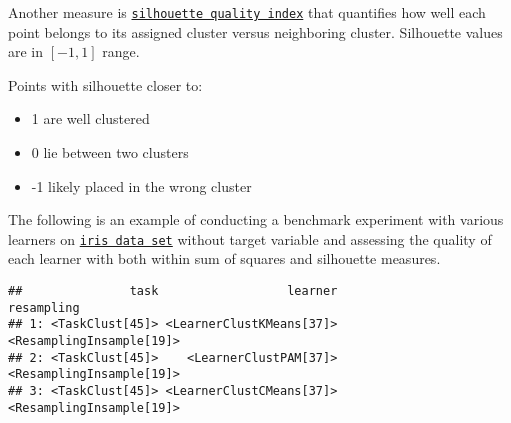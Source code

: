 \documentclass[
]{scrbook}
\newenvironment{Shaded}{\begin{snugshade}}{\end{snugshade}}
\newcommand{\AttributeTok}[1]{\textcolor[rgb]{0.77,0.63,0.00}{#1}}
\newcommand{\DecValTok}[1]{\textcolor[rgb]{0.00,0.00,0.81}{#1}}
\newcommand{\FunctionTok}[1]{\textcolor[rgb]{0.00,0.00,0.00}{#1}}
\newcommand{\NormalTok}[1]{#1}
\newcommand{\OtherTok}[1]{\textcolor[rgb]{0.56,0.35,0.01}{#1}}
\newcommand{\SpecialCharTok}[1]{\textcolor[rgb]{0.00,0.00,0.00}{#1}}
\newcommand{\StringTok}[1]{\textcolor[rgb]{0.31,0.60,0.02}{#1}}
\providecommand{\tightlist}{%
  \setlength{\itemsep}{0pt}\setlength{\parskip}{0pt}}
\renewenvironment{Shaded} {\begin{snugshade}\small} {\end{snugshade}}
\begin{document}
Another measure is \href{https://mlr3cluster.mlr-org.com/reference/mlr_measures_clust.silhouette.html}{\texttt{silhouette\ quality\ index}} that quantifies how well each point belongs to its assigned cluster versus neighboring cluster.
Silhouette values are in \([-1, 1]\) range.

Points with silhouette closer to:

\begin{itemize}
\tightlist
\item
  1 are well clustered
\item
  0 lie between two clusters
\item
  -1 likely placed in the wrong cluster
\end{itemize}

The following is an example of conducting a benchmark experiment with various learners on \href{https://mlr3.mlr-org.com/reference/mlr_tasks_iris.html}{\texttt{iris\ data\ set}} without target variable and assessing the quality of each learner with both within sum of squares and silhouette measures.

\begin{Shaded}
\end{Shaded}

\begin{verbatim}
##               task                  learner               resampling
## 1: <TaskClust[45]> <LearnerClustKMeans[37]> <ResamplingInsample[19]>
## 2: <TaskClust[45]>    <LearnerClustPAM[37]> <ResamplingInsample[19]>
## 3: <TaskClust[45]> <LearnerClustCMeans[37]> <ResamplingInsample[19]>
\end{verbatim}
\end{document}
